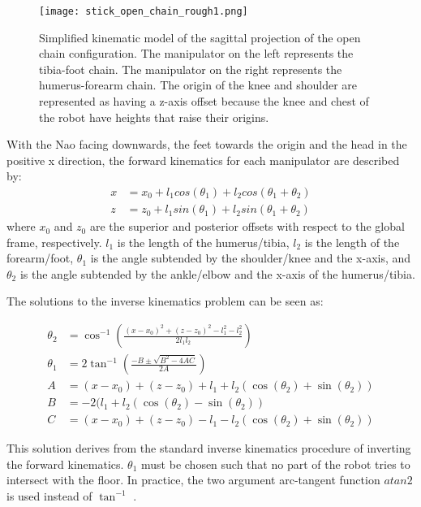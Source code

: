 \begin{figure}
	\centering
	\texttt{[image: stick\_open\_chain\_rough1.png]}
	\caption
	{Simplified kinematic model of the sagittal projection of the open chain configuration.
	The manipulator on the left represents the tibia-foot chain. The manipulator on the right
	represents the humerus-forearm chain. The origin of the knee and shoulder are represented as 
	having a z-axis offset because the knee and chest of the robot have heights that raise their 
	origins.}
	\label{fig:open_chain1}
\end{figure}

With the Nao facing downwards, the feet towards the origin and the head in the positive x direction, 
the forward kinematics for each manipulator are described by:
\begin{align}
	x &= x_0 + l_1 cos(\theta_1) + l_2 cos(\theta_1 + \theta_2) \\
	z &= z_0 + l_1 sin(\theta_1) + l_2 sin(\theta_1 + \theta_2)
\end{align}
where $x_0$ and $z_0$ are the superior and posterior offsets with respect to the global frame, respectively. $l_1$ is the length of the
humerus/tibia, $l_2$ is the length of the forearm/foot, $\theta_1$ is the angle subtended by the 
shoulder/knee and the x-axis, and $\theta_2$ is the angle subtended by the ankle/elbow and the x-axis of the humerus/tibia.

The solutions to the inverse kinematics problem can be seen as:

\begin{align}
	\theta_2 &= \cos^{-1} \left (\frac{(x - x_0)^2 + (z - z_0)^2 - l_1^2 - l_2^2}{2 l_1 l_2} \right ) \label{eq:open_fk_eq1}\\
	\theta_1 &= 2 \tan^{-1} \left (\frac{-B \pm \sqrt{B^2 - 4AC}}{2A} \right ) \label{eq:open_fk_eq2}\\
	A &= (x - x_0) + (z - z_0) + l_1 + l_2 (\cos(\theta_2) + \sin(\theta_2)) \\
	B &= -2(l_1 + l_2(\cos(\theta_2) - \sin(\theta_2)) \\
	C &= (x - x_0) + (z - z_0) - l_1 - l_2 (\cos(\theta_2) + \sin(\theta_2))
\end{align}

This solution derives from the standard inverse kinematics procedure of inverting the forward kinematics.
$\theta_1$ must be chosen such that no part of the robot tries to intersect with the floor. 
In practice, the two argument arc-tangent function $atan2$ is used instead of $\tan^{-1}$ .

